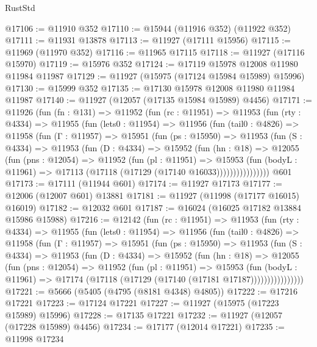 \begin{lexlean}{RustStd}
\begin{coremodule}
@17106 := @11910 @352
@17110 := @15944 (@11916 @352) (@11922 @352)
@17111 := @11931 @13878
@17113 := @11927 (@17111 @15956)
@17115 := @11969 (@11970 @352)
@17116 := @11965 @17115
@17118 := @11927 (@17116 @15970)
@17119 := @15976 @352
@17124 := @17119 @15978 @12008 @11980 @11984 @11987
@17129 := @11927 (@15975 (@17124 @15984 @15989) @15996)
@17130 := @15999 @352
@17135 := @17130 @15978 @12008 @11980 @11984 @11987
@17140 := @11927 (@12057 (@17135 @15984 @15989) @4456)
@17171 := @11926
    (fun (fn : @131) =>
    @11952
      (fun (rc : @11951) =>
      @11953
        (fun (rty : @4334) =>
        @11955
          (fun (lets0 : @11954) =>
          @11956
            (fun (tail0 : @4826) =>
            @11958
              (fun (Γ : @11957) =>
              @15951
                (fun (ps : @15950) =>
                @11953
                  (fun (S : @4334) =>
                  @11953
                    (fun (D : @4334) =>
                    @15952
                      (fun (hn : @18) =>
                      @12055
                        (fun (pns : @12054) =>
                        @11952
                          (fun (pl : @11951) =>
                          @15953
                            (fun (bodyL : @11961) =>
                            @17113 (@17118 (@17129 (@17140 @16033))))))))))))))))
    @601
@17173 := @17111 (@11944 @601)
@17174 := @11927 @17173
@17177 := @12006 (@12007 @601) @13881
@17181 := @11927 (@11998 (@17177 @16015) @16019)
@17182 := @12032 @601
@17187 := @16024 (@16025 @17182 @13884 @15986 @15988)
@17216 := @12142
    (fun (rc : @11951) =>
    @11953
      (fun (rty : @4334) =>
      @11955
        (fun (lets0 : @11954) =>
        @11956
          (fun (tail0 : @4826) =>
          @11958
            (fun (Γ : @11957) =>
            @15951
              (fun (ps : @15950) =>
              @11953
                (fun (S : @4334) =>
                @11953
                  (fun (D : @4334) =>
                  @15952
                    (fun (hn : @18) =>
                    @12055
                      (fun (pns : @12054) =>
                      @11952
                        (fun (pl : @11951) =>
                        @15953
                          (fun (bodyL : @11961) =>
                          @17174 (@17118 (@17129 (@17140 (@17181 @17187))))))))))))))))
@17221 := @5666 (@5405 (@4795 (@8181 @4348) @4805))
@17222 := @17216 @17221
@17223 := @17124 @17221
@17227 := @11927 (@15975 (@17223 @15989) @15996)
@17228 := @17135 @17221
@17232 := @11927 (@12057 (@17228 @15989) @4456)
@17234 := @17177 (@12014 @17221)
@17235 := @11998 @17234

\end{coremodule}
\end{lexlean}
